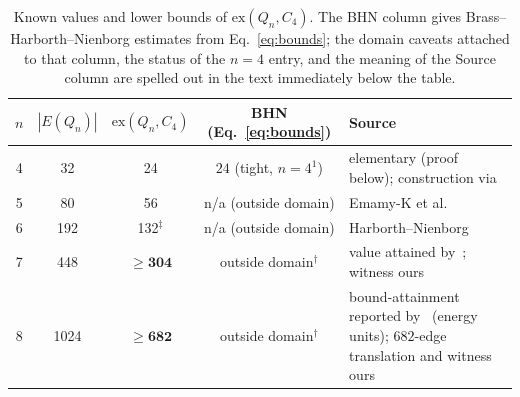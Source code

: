 \documentclass[12pt]{article}
\newcommand{\ex}{\mathrm{ex}}
\begin{document}
\begin{table}[ht]
\centering\small
\caption{Known values and lower bounds of $\ex(Q_n,C_4)$. The BHN column
  gives Brass--Harborth--Nienborg estimates from Eq.~\eqref{eq:bounds}; the
  domain caveats attached to that column, the status of the $n=4$ entry,
  and the meaning of the Source column are spelled out in the text
  immediately below the table.}
\label{tab:values}\medskip
\begin{tabular}{@{}ccccp{5.1cm}@{}}
\toprule
$n$ & $|E(Q_n)|$ & $\ex(Q_n,C_4)$ & BHN (Eq.~\ref{eq:bounds}) & Source\\
\midrule
4 &   32 & 24  & $24$ (tight, $n=4^1$) & elementary (proof below); construction via~\cite{BHN95}\\
5 &   80 & 56  & n/a (outside domain) & Emamy-K et al.~\cite{EGR92}\\
6 &  192 & 132$^{\ddagger}$ & n/a (outside domain) & Harborth--Nienborg~\cite{HN94}\\
7 &  448 & $\ge\mathbf{304}$ & outside domain$^{\dagger}$ & value attained by~\cite{DPTV79}; witness ours\\
8 & 1024 & $\ge\mathbf{682}$ & outside domain$^{\dagger}$ & bound-attainment reported by~\cite{MPR95} (energy units); $682$-edge translation and witness ours\\
\bottomrule
\end{tabular}
\end{table}
\end{document}

